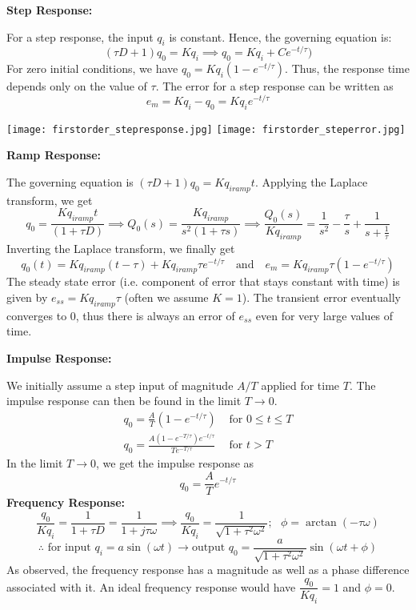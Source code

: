 \documentclass[11pt]{article}
\theoremstyle{definition}
\begin{document}
\textbf{\large Step Response:}

For a step response, the input $q_i$ is constant. Hence, the governing equation is:
$$(\tau D+1)q_0=Kq_i\implies q_0=Kq_i +Ce^{-t/\tau})$$
For zero initial conditions, we have $q_0=Kq_i(1-e^{-t/\tau})$. Thus, the response time depends only on the value of $\tau$. The error for a step response can be written as
$$e_m=Kq_i-q_0=Kq_ie^{-t/\tau}$$
\vspace{-3mm}

\begin{center}
\texttt{[image: firstorder\_stepresponse.jpg]}
\texttt{[image: firstorder\_steperror.jpg]}
\end{center}
\newpage
\textbf{\large Ramp Response:}

The governing equation is $(\tau D+1)q_0=Kq_{iramp}t$. Applying the Laplace transform, we get
$$q_0=\frac{Kq_{iramp}t}{(1+\tau D)}\implies Q_0(s)=\frac{Kq_{iramp}}{s^2(1+\tau s)}\implies \frac{Q_0(s)}{Kq_{iramp}}=\frac{1}{s^2}-\frac{\tau}{s}+\frac{1}{s+\frac{1}{\tau}}$$
Inverting the Laplace transform, we finally get $$q_0(t)=Kq_{iramp}(t-\tau)+Kq_{iramp}\tau e^{-t/\tau}\text{ }\text{ and }\text{ }e_m=Kq_{iramp}\tau(1-e^{-t/\tau})$$
The steady state error (i.e. component of error that stays constant with time) is given by $e_{ss}=Kq_{iramp}\tau$ (often we assume $K=1$). The transient error eventually converges to 0, thus there is always an error of $e_{ss}$ even for very large values of time.

\textbf{\large Impulse Response:}

We initially assume a step input of magnitude $A/T$ applied for time $T$. The impulse response can then be found in the limit $T\to 0$.
\begin{align*}
q_0=\frac{A}{T}(1-e^{-t/\tau})&\text{ for }0\leqslant t\leqslant T\\
q_0=\frac{A(1-e^{-T/\tau})e^{-t/\tau}}{Te^{-T/\tau}}&\text{ for }t>T
\end{align*}
In the limit $T\to 0$, we get the impulse response as
$$q_0=\frac{A}{T}e^{-t/\tau}$$
\textbf{Frequency Response:}
$$\frac{q_0}{Kq_i}=\frac{1}{1+\tau D}=\frac{1}{1+j\tau\omega}\implies \frac{q_0}{Kq_i}=\frac{1}{\sqrt{1+\tau^2\omega^2}};\text{ }\phi=\arctan(-\tau\omega)$$
$$\therefore\text{ for input }q_i=a\sin(\omega t)\rightarrow \text{output }q_0=\frac{a}{\sqrt{1+\tau^2\omega^2}}\sin(\omega t+\phi)$$
As observed, the frequency response has a magnitude as well as a phase difference associated with it. An ideal frequency response would have $\dfrac{q_0}{Kq_i}=1$ and $\phi=0$.
\end{document}
